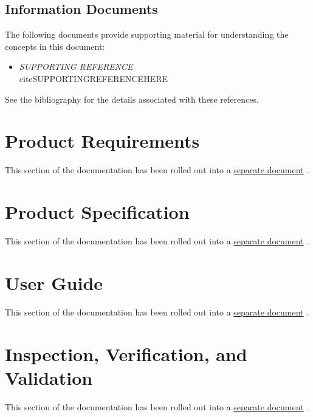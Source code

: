 \documentclass[twoside,11pt,titlepage]{report}
\begin{document}
\section{Information Documents}
The following documents provide supporting material for understanding the
concepts in this document:

\begin{itemize}
\item{\em SUPPORTING REFERENCE} \\cite{SUPPORTINGREFERENCE}HERE
\end{itemize}

See the bibliography for the details associated with these references.


\chapter{Product Requirements}

This section of the documentation has been rolled out into a
\href{file:MODELReqt.pdf}{separate document}
\cite{trickhlaenv:MODELReqt}.

\chapter{Product Specification}

This section of the documentation has been rolled out into a
\href{file:MODELSpec.pdf}{separate document}
\cite{trickhlaenv:MODELSpec}.

\chapter{User Guide}

This section of the documentation has been rolled out into a
\href{file:MODELUser.pdf}{separate document}
\cite{trickhlaenv:MODELUser}.

\chapter{Inspection, Verification, and Validation}

This section of the documentation has been rolled out into a
\href{file:MODELIVV.pdf}{separate document}
\cite{trickhlaenv:MODELIVV}.

\newpage
{}



\end{document}
